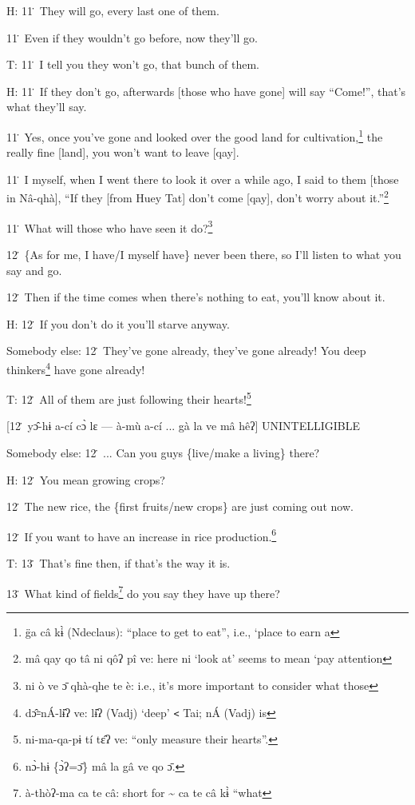 H: 11\. They will go, every last one of them.

11\. Even if they wouldn't go before, now they'll go.

T: 11\. I tell you they won't go, that bunch of them.

H: 11\. If they don't go, afterwards [those who have gone] will say ``Come!'',
that's what they'll say.

11\. Yes, once you've gone and looked over the good land for cultivation,\footnote{g̈a câ kɨ̀ (Ndeclaus): ``place to get to eat'', i.e., `place to earn a} the
really fine [land], you won't want to leave [qay].

11\. I myself, when I went there to look it over a while ago, I said to them [those
in Nâ-qhà], ``If they [from Huey Tat] don't come [qay], don't worry about it.''\footnote{mâ qay qo tâ ni qôʔ pî ve: here ni `look at' seems to mean `pay attention}

11\. What will those who have seen it do?\footnote{ni ò ve ɔ̄ qhà-qhe te è: i.e., it's more important to consider what those}

12\. \{As for me, I have/I myself have\} never been there, so I'll listen to what
you say and go.

12\. Then if the time comes when there's nothing to eat, you'll know about it.

H: 12\. If you don't do it you'll starve anyway.

Somebody else: 12\. They've gone already, they've gone already! You deep thinkers\footnote{dɔ̂꞊nÁ-lɨ̂ʔ ve: lɨ̂ʔ (Vadj) `deep' \texttt{<} Tai; nÁ (Vadj) is}
have gone already!

T: 12\. All of them are just following their hearts!\footnote{ni-ma-qa-pɨ tí tɛ̂ʔ ve: ``only measure their hearts''.}

[12\. yɔ̂-hɨ a-cí cɔ̀ lɛ --- à-mù a-cí ... gà la ve mâ hêʔ] UNINTELLIGIBLE

Somebody else: 12\. ... Can you guys \{live/make a living\} there?

H: 12\. You mean growing crops?

12\. The new rice, the \{first fruits/new crops\} are just coming out now.

12\. If you want to have an increase in rice production.\footnote{nɔ̀-hɨ \{ɔ̀ʔ=ɔ̄\} mâ la gâ ve qo ɔ̄.}

T: 13\. That's fine then, if that's the way it is.

13\. What kind of fields\footnote{à-thòʔ-ma ca te câ: short for \textasciitilde{} ca te câ kɨ̀ ``what} do you say they have up there?

